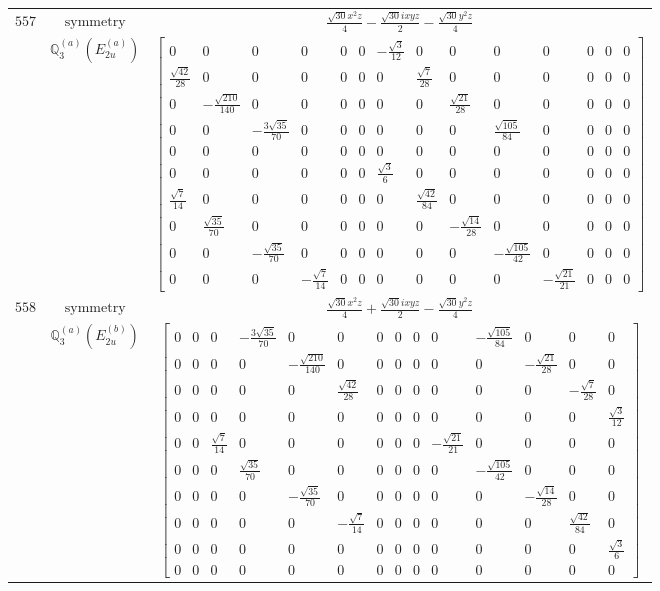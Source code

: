 \documentclass[fleqn,8pt,landscape]{jsarticle}
\begin{document}
\begin{longtable}{ccc}
$ 557 $ & $ \text{symmetry} $ & $ \frac{\sqrt{30} x^{2} z}{4} - \frac{\sqrt{30} i x y z}{2} - \frac{\sqrt{30} y^{2} z}{4} $ \\
$  $ & $ \mathbb{Q}_{3}^{(a)}(E_{2u}^{(a)}) $ & $ \begin{bmatrix} 0 & 0 & 0 & 0 & 0 & 0 & - \frac{\sqrt{3}}{12} & 0 & 0 & 0 & 0 & 0 & 0 & 0 \\ \frac{\sqrt{42}}{28} & 0 & 0 & 0 & 0 & 0 & 0 & \frac{\sqrt{7}}{28} & 0 & 0 & 0 & 0 & 0 & 0 \\ 0 & - \frac{\sqrt{210}}{140} & 0 & 0 & 0 & 0 & 0 & 0 & \frac{\sqrt{21}}{28} & 0 & 0 & 0 & 0 & 0 \\ 0 & 0 & - \frac{3 \sqrt{35}}{70} & 0 & 0 & 0 & 0 & 0 & 0 & \frac{\sqrt{105}}{84} & 0 & 0 & 0 & 0 \\ 0 & 0 & 0 & 0 & 0 & 0 & 0 & 0 & 0 & 0 & 0 & 0 & 0 & 0 \\ 0 & 0 & 0 & 0 & 0 & 0 & \frac{\sqrt{3}}{6} & 0 & 0 & 0 & 0 & 0 & 0 & 0 \\ \frac{\sqrt{7}}{14} & 0 & 0 & 0 & 0 & 0 & 0 & \frac{\sqrt{42}}{84} & 0 & 0 & 0 & 0 & 0 & 0 \\ 0 & \frac{\sqrt{35}}{70} & 0 & 0 & 0 & 0 & 0 & 0 & - \frac{\sqrt{14}}{28} & 0 & 0 & 0 & 0 & 0 \\ 0 & 0 & - \frac{\sqrt{35}}{70} & 0 & 0 & 0 & 0 & 0 & 0 & - \frac{\sqrt{105}}{42} & 0 & 0 & 0 & 0 \\ 0 & 0 & 0 & - \frac{\sqrt{7}}{14} & 0 & 0 & 0 & 0 & 0 & 0 & - \frac{\sqrt{21}}{21} & 0 & 0 & 0 \end{bmatrix} $ \\ \hline
$ 558 $ & $ \text{symmetry} $ & $ \frac{\sqrt{30} x^{2} z}{4} + \frac{\sqrt{30} i x y z}{2} - \frac{\sqrt{30} y^{2} z}{4} $ \\
$  $ & $ \mathbb{Q}_{3}^{(a)}(E_{2u}^{(b)}) $ & $ \begin{bmatrix} 0 & 0 & 0 & - \frac{3 \sqrt{35}}{70} & 0 & 0 & 0 & 0 & 0 & 0 & - \frac{\sqrt{105}}{84} & 0 & 0 & 0 \\ 0 & 0 & 0 & 0 & - \frac{\sqrt{210}}{140} & 0 & 0 & 0 & 0 & 0 & 0 & - \frac{\sqrt{21}}{28} & 0 & 0 \\ 0 & 0 & 0 & 0 & 0 & \frac{\sqrt{42}}{28} & 0 & 0 & 0 & 0 & 0 & 0 & - \frac{\sqrt{7}}{28} & 0 \\ 0 & 0 & 0 & 0 & 0 & 0 & 0 & 0 & 0 & 0 & 0 & 0 & 0 & \frac{\sqrt{3}}{12} \\ 0 & 0 & \frac{\sqrt{7}}{14} & 0 & 0 & 0 & 0 & 0 & 0 & - \frac{\sqrt{21}}{21} & 0 & 0 & 0 & 0 \\ 0 & 0 & 0 & \frac{\sqrt{35}}{70} & 0 & 0 & 0 & 0 & 0 & 0 & - \frac{\sqrt{105}}{42} & 0 & 0 & 0 \\ 0 & 0 & 0 & 0 & - \frac{\sqrt{35}}{70} & 0 & 0 & 0 & 0 & 0 & 0 & - \frac{\sqrt{14}}{28} & 0 & 0 \\ 0 & 0 & 0 & 0 & 0 & - \frac{\sqrt{7}}{14} & 0 & 0 & 0 & 0 & 0 & 0 & \frac{\sqrt{42}}{84} & 0 \\ 0 & 0 & 0 & 0 & 0 & 0 & 0 & 0 & 0 & 0 & 0 & 0 & 0 & \frac{\sqrt{3}}{6} \\ 0 & 0 & 0 & 0 & 0 & 0 & 0 & 0 & 0 & 0 & 0 & 0 & 0 & 0 \end{bmatrix} $ \\ \hline

\end{longtable}
\end{document}
